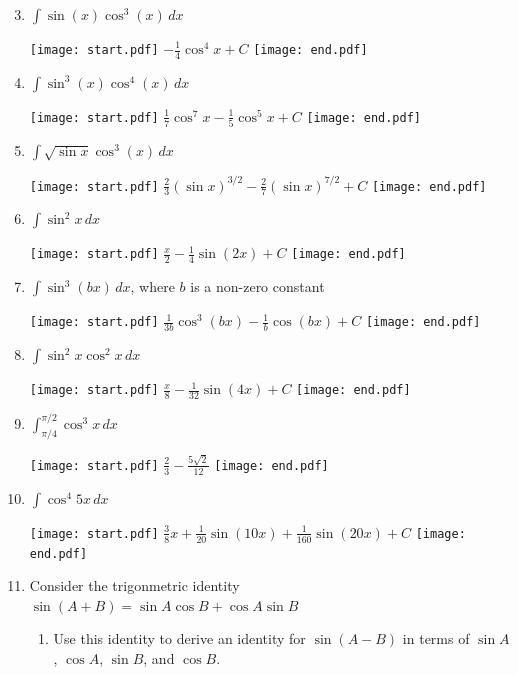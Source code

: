 \documentclass[12pt]{article}
\begin{document}
\begin{enumerate}
\setcounter{enumi}{2}

\item $\int \sin{(x)}\cos^3{(x)}\,dx$ 

\texttt{[image: start.pdf]}
{{$-\frac{1}{4}\cos^4{x}+C$}}
\texttt{[image: end.pdf]}


\item $\int \sin^3{(x)}\cos^4{(x)}\,dx$ 

\texttt{[image: start.pdf]}
{{$\frac{1}{7}\cos^7{x}-\frac{1}{5}\cos^5{x}+C$}}
\texttt{[image: end.pdf]}


\item $\int \sqrt{\sin{x}}\cos^{3}{(x)}\,dx$

\texttt{[image: start.pdf]}
{{$\frac{2}{3}(\sin{x})^{3/2}-\frac{2}{7}(\sin{x})^{7/2}+C$}}
\texttt{[image: end.pdf]}


\item $\int \sin^2{x} \,dx$ 

\texttt{[image: start.pdf]}
{{$\frac{x}{2}-\frac{1}{4}\sin{(2x)}+C$}}
\texttt{[image: end.pdf]}


\item $\int \sin^3{(bx)}\,dx$, where $b$ is a non-zero constant

\texttt{[image: start.pdf]}
{{$\frac{1}{3b}\cos^3{(bx)}-\frac{1}{b}\cos{(bx)}+C$}}
\texttt{[image: end.pdf]}


\item $\int \sin^2{x}\cos^2{x}\,dx$ 

\texttt{[image: start.pdf]}
{{$\frac{x}{8}-\frac{1}{32}\sin{(4x)}+C$}}
\texttt{[image: end.pdf]}


\item $\int_{\pi/4}^{\pi/2} \cos^3{x}\,dx$ 

\texttt{[image: start.pdf]}
{{$\frac{2}{3}-\frac{5\sqrt{2}}{12}$}}
\texttt{[image: end.pdf]}


\item $\int \cos^4{5x}\,dx$

\texttt{[image: start.pdf]}
{{$\frac{3}{8}x+\frac{1}{20}\sin{(10x)}+\frac{1}{160}\sin{(20x)}+C$}}
\texttt{[image: end.pdf]}


\item Consider the trigonmetric identity $\sin{(A+B)}=\sin{A}\cos{B}+\cos{A}\sin{B}$

\begin{enumerate}

\item Use this identity to derive an identity for $\sin{(A-B)}$ in terms of $\sin{A}$, $\cos{A}$, $\sin{B}$, and $\cos{B}$.


\end{enumerate}
\end{enumerate}
\end{document}
